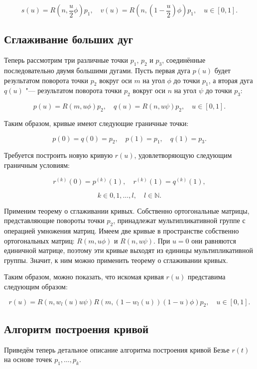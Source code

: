 \begin{equation}
s(u)=R(n,\frac{u}{2}\phi)p_1, \quad v(u)=R(n,(1-\frac{u}{2})\phi)p_1, \quad u \in [0,1].
\label{two-dimension-big-arc-halfs}
\end{equation}

\subsection*{Сглаживание больших дуг}

Теперь рассмотрим три различные точки $p_1$, $p_2$ и $p_3$, соединённые последовательно двумя большими
дугами. Пусть первая дуга $p(u)$ будет результатом поворота точки $p_2$ вокруг оси $m$ на угол $\phi$ до точки $p_1$,
а вторая дуга $q(u)$ "--- результатом поворота точки $p_2$ вокруг оси $n$ на угол $\psi$ до точки $p_3$:

$$
p(u)=R(m,u\phi)p_2, \quad q(u)=R(n,u\psi)p_2, \quad u \in [0,1].
$$

Таким образом, кривые имеют следующие граничные точки:

$$
p(0)=q(0)=p_2, \quad p(1)=p_1, \quad q(1)=p_3.
$$

Требуется построить новую кривую $r(u)$, удовлетворяющую следующим граничным условиям:

$$
r^{(k)}(0)=p^{(k)}(1), \quad r^{(k)}(1)=q^{(k)}(1),
$$

$$
k \in {0,1,\dots,l}, \quad l \in \mathbb{N}.
$$

Применим теорему о сглаживании кривых. Собственно ортогональные матрицы, представляющие повороты
точки $p_2$, принадлежат мультипликативной группе с операцией умножения матриц. Имеем две кривые в пространстве
собственно ортогональных матриц: $R(m,u\phi)$ и $R(n,u\psi)$. При $u=0$ они равняются единичной матрице, поэтому эти
кривые выходят из единицы мультипликативной группы. Значит, к ним можно применить теорему о сглаживании кривых.

Таким образом, можно показать, что искомая кривая $r(u)$ представима следующим образом:

$$
r(u)=R(n,w_l(u)u\psi)R(m,(1-w_l(u))(1-u)\phi)p_2, \quad u \in [0,1].
$$

\subsection*{Алгоритм построения кривой}

Приведём теперь детальное описание алгоритма построения кривой Безье $r(t)$ на основе точек $p_1,\dots,p_k$.

